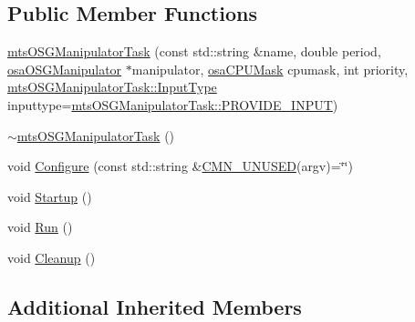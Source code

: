 \subsection*{Public Member Functions}
\begin{DoxyCompactItemize}
\item 
\hyperlink{classmts_o_s_g_manipulator_task_a88e93504aaff6f88fba8cd17ceb328ca}{mts\-O\-S\-G\-Manipulator\-Task} (const std\-::string \&name, double period, \hyperlink{classosa_o_s_g_manipulator}{osa\-O\-S\-G\-Manipulator} $\ast$manipulator, \hyperlink{osa_c_p_u_affinity_8h_aaec7cdd7797e5e6eb5438c15fee5477a}{osa\-C\-P\-U\-Mask} cpumask, int priority, \hyperlink{classmts_o_s_g_manipulator_task_a176aa50980ddf34d1150514bb620cb8f}{mts\-O\-S\-G\-Manipulator\-Task\-::\-Input\-Type} inputtype=\hyperlink{classmts_o_s_g_manipulator_task_a176aa50980ddf34d1150514bb620cb8fa73f760c3f4b883d0ce1a241d172e626a}{mts\-O\-S\-G\-Manipulator\-Task\-::\-P\-R\-O\-V\-I\-D\-E\-\_\-\-I\-N\-P\-U\-T})
\item 
\hyperlink{classmts_o_s_g_manipulator_task_ad752b96d61680cc033e02d574fae52ab}{$\sim$mts\-O\-S\-G\-Manipulator\-Task} ()
\item 
void \hyperlink{classmts_o_s_g_manipulator_task_a0d1824dee2f6f86e17b10dcc98bfbe40}{Configure} (const std\-::string \&\hyperlink{cmn_portability_8h_a021894e2626935fa2305434b1e893ff6}{C\-M\-N\-\_\-\-U\-N\-U\-S\-E\-D}(argv)=\char`\"{}\char`\"{})
\item 
void \hyperlink{classmts_o_s_g_manipulator_task_a1cda4027909f2ec39729af5558b34e6e}{Startup} ()
\item 
void \hyperlink{classmts_o_s_g_manipulator_task_a7cf39031d1894ae1b320410d51703213}{Run} ()
\item 
void \hyperlink{classmts_o_s_g_manipulator_task_ac90dcaf4af30c82a4f3043a2f0e152cb}{Cleanup} ()
\end{DoxyCompactItemize}
\subsection*{Additional Inherited Members}


